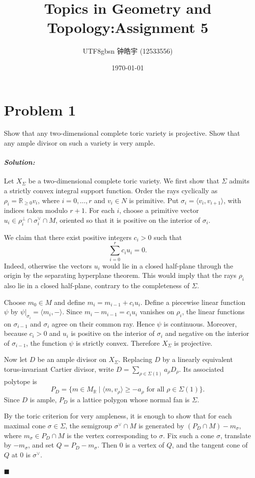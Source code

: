 \documentclass[12pt, a4paper]{article}
\title{Topics in Geometry and Topology:Assignment 5}
\author{
    \begin{CJK*}{UTF8}{gbsn}
    钟皓宇 (12533556)
    \end{CJK*}
}
\date{\today}
\newenvironment{solution}
  {\paragraph{\textit{Solution:}}\par\medskip}
  {\hfill$\blacksquare$\vspace{0.1cm}}
\begin{document}
\maketitle

\section*{Problem 1}
Show that any two-dimensional complete toric variety is projective. Show that any ample divisor on such a variety is very ample. 
\begin{solution}
    Let \(X_\Sigma\) be a two-dimensional complete toric variety.  We first
show that \(\Sigma\) admits a strictly convex integral support function.
Order the rays cyclically as \(\rho_i=\mathbb R_{\ge 0}v_i\), where
\(i=0,\dots,r\) and \(v_i\in N\) is primitive.  Put
\(\sigma_i=\langle v_i,v_{i+1}\rangle\), with indices taken modulo
\(r+1\).  For each \(i\), choose a primitive vector
\(u_i\in \rho_i^\perp\cap\sigma_i^\vee\cap M\), oriented so that it is
positive on the interior of \(\sigma_i\).

We claim that there exist positive integers \(c_i>0\) such that
\[
\sum_{i=0}^r c_i u_i=0.
\]
Indeed, otherwise the vectors \(u_i\) would lie in a closed half-plane
through the origin by the separating hyperplane theorem.  This would
imply that the rays \(\rho_i\) also lie in a closed half-plane, contrary
to the completeness of \(\Sigma\).

Choose \(m_0\in M\) and define \(m_i=m_{i-1}+c_i u_i\).  Define a
piecewise linear function \(\psi\) by
\(\psi|_{\sigma_i}=\langle m_i,-\rangle\).  Since
\(m_i-m_{i-1}=c_i u_i\) vanishes on \(\rho_i\), the linear functions on
\(\sigma_{i-1}\) and \(\sigma_i\) agree on their common ray.  Hence
\(\psi\) is continuous.  Moreover, because \(c_i>0\) and \(u_i\) is
positive on the interior of \(\sigma_i\) and negative on the interior of
\(\sigma_{i-1}\), the function \(\psi\) is strictly convex.  Therefore
\(X_\Sigma\) is projective.

Now let \(D\) be an ample divisor on \(X_\Sigma\).  Replacing \(D\) by a
linearly equivalent torus-invariant Cartier divisor, write
\(D=\sum_{\rho\in\Sigma(1)}a_\rho D_\rho\).  Its associated polytope is
\[
P_D=
\{m\in M_{\mathbb R}\mid
\langle m,v_\rho\rangle\ge -a_\rho
\text{ for all }\rho\in\Sigma(1)\}.
\]
Since \(D\) is ample, \(P_D\) is a lattice polygon whose normal fan is
\(\Sigma\).

By the toric criterion for very ampleness, it is enough to show that for
each maximal cone \(\sigma\in\Sigma\), the semigroup
\(\sigma^\vee\cap M\) is generated by \((P_D\cap M)-m_\sigma\), where
\(m_\sigma\in P_D\cap M\) is the vertex corresponding to \(\sigma\).
Fix such a cone \(\sigma\), translate by \(-m_\sigma\), and set
\(Q=P_D-m_\sigma\).  Then \(0\) is a vertex of \(Q\), and the tangent
cone of \(Q\) at \(0\) is \(\sigma^\vee\).


\end{solution}
\end{document}
